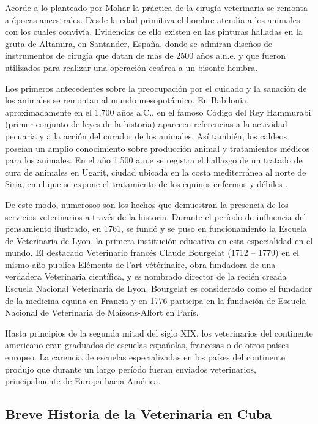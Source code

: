 Acorde a lo planteado por Mohar  la práctica de la cirugía veterinaria se remonta a épocas ancestrales. Desde la edad primitiva el hombre atendía a los animales con los cuales convivía. Evidencias de ello existen en las pinturas halladas en la gruta de Altamira, en Santander, España, donde se admiran diseños de instrumentos de cirugía que datan de más de 2500 años a.n.e. y que fueron utilizados para realizar una operación cesárea a un bisonte hembra.   

Los primeros antecedentes sobre la preocupación por el cuidado y la sanación de los animales se remontan al mundo mesopotámico. En Babilonia, aproximadamente en el 1.700 años a.C., en el famoso Código del Rey Hammurabi (primer conjunto de leyes de la historia) aparecen referencias a la actividad pecuaria y a la acción del curador de los animales. Así también, los caldeos poseían un amplio conocimiento sobre producción animal y tratamientos médicos para los animales. En el año 1.500 a.n.e se registra el hallazgo de un tratado de cura de animales en Ugarit, ciudad ubicada en la costa mediterránea al norte de Siria, en el que se expone el tratamiento de los equinos enfermos y débiles . 

De este modo, numerosos son los hechos que demuestran la presencia de los servicios veterinarios a través de la historia. 
Durante el período de influencia del pensamiento ilustrado, en 1761, se fundó y se puso en funcionamiento la Escuela de Veterinaria de Lyon, la primera institución educativa en esta especialidad en el mundo. El destacado Veterinario francés Claude Bourgelat (1712 – 1779) en el mismo año publica Eléments de l’art vétérinaire, obra fundadora de una verdadera Veterinaria científica, y es nombrado director de la recién creada Escuela Nacional Veterinaria de Lyon. Bourgelat es considerado como el fundador de la medicina equina en Francia y en 1776 participa en la fundación de Escuela Nacional de Veterinaria de Maisons-Alfort en París.  

Hasta principios de la segunda mitad del siglo XIX, los veterinarios del continente americano eran graduados de escuelas españolas, francesas o de otros países europeo. La carencia de escuelas especializadas en los países del continente produjo que durante un largo período fueran enviados veterinarios, principalmente de Europa hacia América.  

\subsection{Breve Historia de la Veterinaria en Cuba}

